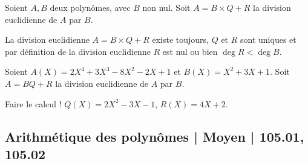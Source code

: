 \begin{question}

Soient $A,B$ deux polynômes, avec $B$ non nul. 
Soit $A = B \times Q + R$ la division euclidienne de $A$ par $B$.

\begin{answers}



\end{answers}
\begin{explanations}
La division euclidienne $A = B \times Q + R$ existe toujours, $Q$ et $R$ sont uniques et par définition de la division euclidienne $R$ est nul ou bien 
$\deg R < \deg B$.
\end{explanations}
\end{question}


\begin{question}

Soient $A(X) = 2 X^4 + 3 X^3 - 8 X^2 - 2 X + 1$ et $B(X) = X^2+3X+1$. Soit $A = BQ+R$ la division euclidienne de $A$ par $B$.
\begin{answers}



\end{answers}
\begin{explanations}
Faire le calcul !
$Q(X) = 2X^2-3X-1$, $R(X) = 4X+2$.
\end{explanations}
\end{question}




\subsection{Arithmétique des polynômes | Moyen | 105.01, 105.02}

